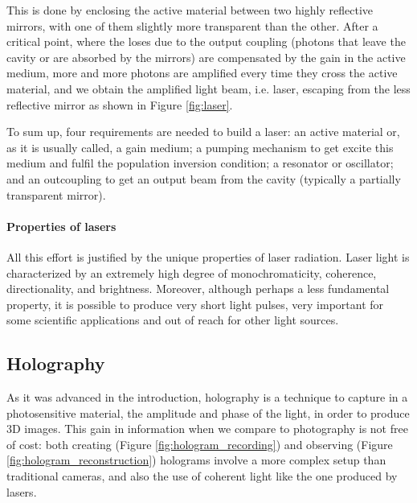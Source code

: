 \documentclass[11pt,a4paper]{article}
\begin{document}
This is done by enclosing the active material between two highly reflective mirrors, with one of them slightly more transparent than the other. After a critical point, where the loses due to the output coupling (photons that leave the cavity or are absorbed by the mirrors) are compensated by the gain in the active medium, more and more photons are amplified every time they cross the active material, and we obtain the amplified light beam, i.e. laser, escaping from the less reflective mirror as shown in Figure \ref{fig:laser}.

To sum up, four requirements are needed to build a laser: an active material or, as it is usually called, a gain medium; a pumping mechanism to get excite this medium and fulfil the population inversion condition; a resonator or oscillator; and an outcoupling to get an output beam from the cavity (typically a partially transparent mirror).

\paragraph{Properties of lasers} All this effort is justified by the unique properties of laser radiation. Laser light is characterized by an extremely high degree of monochromaticity,  coherence, directionality, and brightness. Moreover, although perhaps a less fundamental property, it is possible to produce very short light pulses, very important for some scientific applications and out of reach for other light sources.

\subsection{Holography}\label{sec:Holo}

As it was advanced in the introduction, holography is a technique to capture in a photosensitive material, the amplitude and phase of the light, in order to produce 3D images. This gain in information when we compare to photography is not free of cost: both creating (Figure \ref{fig:hologram_recording}) and observing (Figure \ref{fig:hologram_reconstruction}) holograms involve a more complex setup than traditional cameras, and also the use of coherent light like the one produced by lasers.
\end{document}
